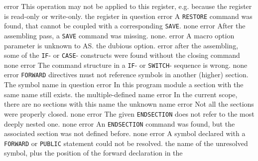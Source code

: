 \documentclass[12pt,twoside]{report}
\newcommand{\tty}[1]{{\tt #1}}
\newcommand{\asname}{{AS}}
\begin{document}
\begin{description}
               {error}
               {This operation may not be applied to this register, e.g. because
                the register is read-only or write-only.}
               {the register in question}
               {error}
               {A \tty{RESTORE} command was found, that cannot be coupled with a
                corresponding \tty{SAVE}.}
               {none}
               {error}
               {After the assembling pass, a \tty{SAVE} command was missing.}
               {none.}
               {error}
               {A macro option parameter is unknown to \asname{}.}
               {the dubious option.}
               {error}
               {after the assembling, some of the \tty{IF}- or \tty{CASE}- constructs
                were found without the closing command}
               {none}
               {error}
               {The command structure in a \tty{IF}- or \tty{SWITCH}- sequence is
                wrong.}
               {none}
               {error}
               {\tty{FORWARD} directives must not reference symbols in
                another (higher) section.}
               {The symbol name in question}
               {error}
               {In this program module a section with the same name still
                exists.}
               {the multiple-defined name}
               {error}
               {In the current scope, there are no sections with this name}
               {the unknown name}
               {error}
               {Not all the sections were properly closed.}
               {none}
               {error}
               {The given \tty{ENDSECTION} does not refer to the most
                deeply nested one.}
               {none}
               {error}
               {An \tty{ENDSECTION} command was found, but the associated section
                was not defined before.}
               {none}
               {error}
               {A symbol declared with a \tty{FORWARD} or \tty{PUBLIC} statement could
                not be resolved.}
               {the name of the unresolved symbol, plus the
                position of the forward declaration in the
}
\end{description}
\end{document}

